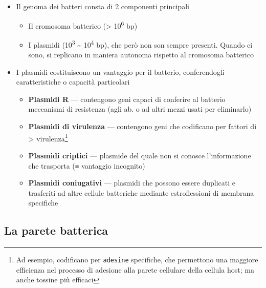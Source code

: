 \documentclass[italian,]{article}
\providecommand{\tightlist}{%
  \setlength{\itemsep}{0pt}\setlength{\parskip}{0pt}}
\begin{document}
\begin{itemize}
\tightlist
\item
  Il genoma dei batteri consta di 2 componenti principali

  \begin{itemize}
  \tightlist
  \item
    Il cromosoma batterico (\textgreater{} 10\textsuperscript{6} bp)
  \item
    I plasmidi (10\textsuperscript{3} \textasciitilde{}
    10\textsuperscript{4} bp), che però non son sempre presenti. Quando
    ci sono, si replicano in maniera autonoma rispetto al cromosoma
    batterico
  \end{itemize}
\item
  I plasmidi costituiscono un vantaggio per il batterio, conferendogli
  caratteristiche o capacità particolari

  \begin{itemize}
  \tightlist
  \item
    \textbf{Plasmidi R} --- contengono geni capaci di conferire al
    batterio meccanismi di resistenza (agli ab. o ad altri mezzi usati
    per eliminarlo)
  \item
    \textbf{Plasmidi di virulenza} --- contengono geni che codificano
    per fattori di \textgreater{} virulenza\footnote{Ad esempio,
      codificano per \texttt{adesine} specifiche, che permettono una
      maggiore efficienza nel processo di adesione alla parete cellulare
      della cellula host; ma anche tossine più efficaci}
  \item
    \textbf{Plasmidi criptici} --- plasmide del quale non si conosce
    l'informazione che trasporta (≡ vantaggio incognito)
  \item
    \textbf{Plasmidi coniugativi} --- plasmidi che possono essere
    duplicati e trasferiti ad altre cellule batteriche mediante
    estroflessioni di membrana specifiche
  \end{itemize}
\end{itemize}

\hypertarget{la-parete-batterica}{%
\subsection{La parete batterica}\label{la-parete-batterica}}
\end{document}
